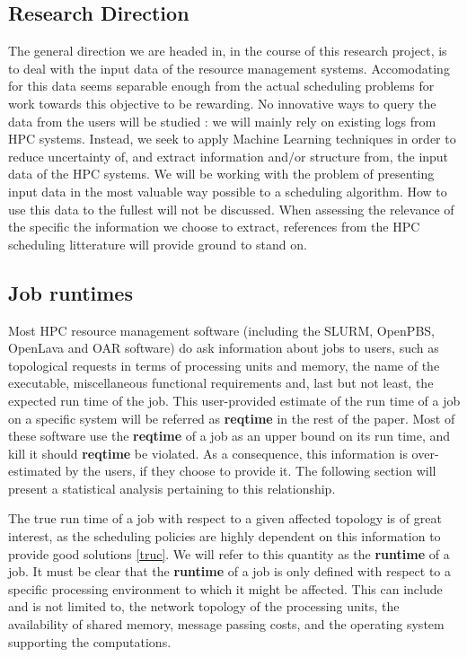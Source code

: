 \documentclass{article}
\begin{document}

\subsection{Research Direction}
The general direction we are headed in, in the course of this research project, is to deal with the input data of the resource management systems.
Accomodating for this data seems separable enough from the actual scheduling problems for work towards this objective to be rewarding.
No innovative ways to query the data from the users will be studied : we will mainly rely on existing logs from HPC systems. Instead, we seek to apply Machine Learning techniques in order to reduce uncertainty of, and extract information and/or structure from, the input data of the HPC systems.
We will be working with the problem of presenting input data in the most valuable way possible to a scheduling algorithm. How to use this data to the fullest will not be discussed.
When assessing the relevance of the specific the information we choose to extract, references from the HPC scheduling litterature will provide ground to stand on.

\subsection{Job runtimes}
Most HPC resource management software (including the SLURM, OpenPBS, OpenLava and OAR software) do ask information about jobs to users, such as topological requests in terms of processing units and memory, the name of the executable, miscellaneous functional requirements and, last but not least, the expected run time of the job. This user-provided estimate of the run time of a job on a specific system will be referred as \textbf{reqtime} in the rest of the paper. Most of these software use the \textbf{reqtime} of a job as an upper bound on its run time, and kill it should \textbf{reqtime} be violated. As a consequence, this information is over-estimated by the users, if they choose to provide it. The following section will present a statistical analysis pertaining to this relationship.

The true run time of a job with respect to a given affected topology is of great interest, as the scheduling policies are highly dependent on this information to provide good solutions \ref{truc}. We will refer to this quantity as the \textbf{runtime} of a job.
It must be clear that the \textbf{runtime} of a job is only defined with respect to a specific processing environment to which it might be affected.
This can include and is not limited to, the network topology of the processing units, the availability of shared memory, message passing costs, and the operating system supporting the computations.
\end{document}
